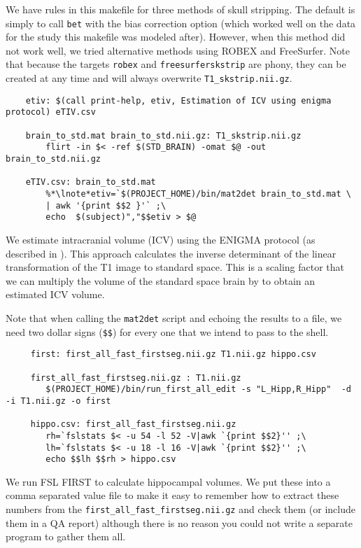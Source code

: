 We have rules in this makefile for three methods of skull
stripping. The default is simply to call \texttt{bet} with the bias
correction option (which worked well on the data for the study this
makefile was modeled after). However, when this method did not work
well, we tried alternative methods using ROBEX and FreeSurfer. Note
that because the targets \texttt{robex} and \texttt{freesurferskstrip}
are phony, they can be created at any time and will always overwrite
\texttt{T1_skstrip.nii.gz}. 


\begin{lstlisting}
	etiv: $(call print-help, etiv, Estimation of ICV using enigma protocol) eTIV.csv

	brain_to_std.mat brain_to_std.nii.gz: T1_skstrip.nii.gz 
		flirt -in $< -ref $(STD_BRAIN) -omat $@ -out brain_to_std.nii.gz

	eTIV.csv: brain_to_std.mat
		%*\lnote*etiv=`$(PROJECT_HOME)/bin/mat2det brain_to_std.mat \
		| awk '{print $$2 }'` ;\
		echo  $(subject)","$$etiv > $@
\end{lstlisting}

We estimate intracranial volume (ICV) using the ENIGMA protocol (as described in
\nameref{sec:practicum3}). This approach calculates the inverse 
determinant of the linear transformation of the T1 image to standard
space. This is a scaling factor that we can multiply the volume of the
standard space brain by to obtain an estimated ICV volume. 

 Note that when calling the \texttt{mat2det} script and
echoing the results to a file, we need two dollar signs (\texttt{\$\$})
for every one that we intend to pass to the shell.  



\begin{lstlisting}
	 first: first_all_fast_firstseg.nii.gz T1.nii.gz hippo.csv

	 first_all_fast_firstseg.nii.gz : T1.nii.gz
		$(PROJECT_HOME)/bin/run_first_all_edit -s "L_Hipp,R_Hipp"  -d -i T1.nii.gz -o first

	 hippo.csv: first_all_fast_firstseg.nii.gz 
		rh=`fslstats $< -u 54 -l 52 -V|awk `{print $$2}'' ;\
		lh=`fslstats $< -u 18 -l 16 -V|awk `{print $$2}'' ;\
		echo $$lh $$rh > hippo.csv
\end{lstlisting}

We run FSL FIRST to calculate hippocampal volumes. We put these into a
comma separated value file to make it easy to remember how to extract
these numbers from the \texttt{first_all_fast_firstseg.nii.gz} and
check them (or include them in a QA report) although there is no
reason you could not write a separate program to gather them all.


